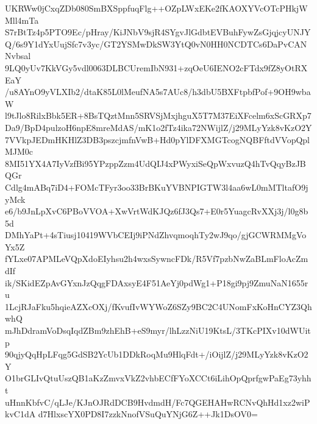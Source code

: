 UKRWw0jCxqZDb080SmBXSppfuqFlg++OZpLWxEKe2fKAOXYVcOTcPHkjWMll4mTa
S7rBtTz4p5PTO9Ec/pHray/KiJNbV9sjR4SYgvJlGdbtEVBuhFywZsGjqjcyUNJY
Q/6s9Y1dYxUujSfc7v3yc/GT2YSMwDkSW3YtQ0vN0HH0NCDTCs6DaPvCANNvbsal
9LQ0yUv7KkVGy5vdl0063DLBCUremIbN931+zqOeU6IENO2cFTdx9fZ8yOtRXEaY
/u8AYnO9yVLXIb2/dtaK85L0lMeufNA5s7AUc8/h3dbU5BXFtpbfPof+9OH9wbaW
l9tJlo8RilxBbk5ER+8BsTQztMnn5SRVSjMxjhguX5T7M37EiXFcelm6xScGRXp7
Da9/BpD4pulzoH6npE8mreMdAS/mK1o2fTz4ika72NWijlZ/j29MLyYzk8vKzO2Y
7VVkpJEDmHKHlZ3DB3pszcjmfnVwB+Hd0pYlDFXMGTcogNQBFftdVVopQplMJM0c
8MI51YX4A7IyVzfBi95YPzppZzm4UdQIJ4xPWyxiSeQpWxvuzQ4hTvQqyBzJBQGr
Cdlg4mABq7iD4+FOMcTFyr3oo33BrBKuYVBNPIGTW3l4aa6wL0mMTltafO9jyMck
e6/b9JnLpXvC6PBoVVOA+XwVrtWdKJQz6fJ3Qs7+E0r5YuagcRvXXj3j/l0g8b5d
DMhYaPt+4sTiusj10419WVbCEIj9iPNdZhvqmoqhTy2wJ9qo/gjGCWRMMgVoYx5Z
fYLxe07APMLeVQpXdoEIyhsu2h4wxsSywncFDk/R5Vf7pzbNwZaBLmFloAcZmdIf
ik/SKidEZpAvGYxnJzQqgFDAxsyE4F51AeYj0pdWg1+P18gi9pj9ZmuNaN1655ru
1LcjRJaFku5hqieAZXcOXj/fKvufIvWYWoZ6SZy9BC2C4UNomFxKoHnCYZ3QhwhQ
mJhDdramVoDsqIqdZBm9zhEhB+eS9myr/lhLzzNiU19KtsL/3TKcPIXv10dWUitp
90qjyQqHpLFqg5GdSB2YcUb1DDkRoqMu9HlqFdt+/iOijlZ/j29MLyYzk8vKzO2Y
O1brGLIvQtuUszQB1aKzZmvxVkZ2vhbECfFYoXCCt6iLihOpQprfgwPaEg73yhht
uHnnKbfvC/qLJe/KJnOJRdDCB9HvdmdH/Fc7QGEHAHwRCNvQhHd1xz2wiPkvC1dA
d7HlxscYX0PD8I7zzkNnofVSuQuYNjG6Z++Jk1DsOV0=
